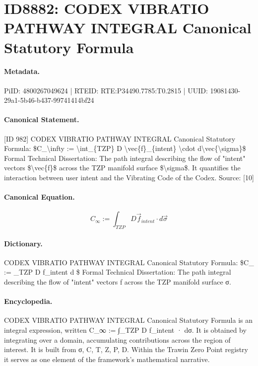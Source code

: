 \section*{ID8882: CODEX VIBRATIO PATHWAY INTEGRAL Canonical Statutory Formula}
\paragraph{Metadata.}
PiID: 4800267049624 | RTEID: RTE:P34490.7785:T0.2815 | UUID: 19081430-29a1-5b46-b437-99741414bf24

\paragraph{Canonical Statement.}
[ID 982] CODEX VIBRATIO PATHWAY INTEGRAL Canonical Statutory Formula: \$C\_\textbackslash{}infty := \textbackslash{}int\_\{TZP\} D \textbackslash{}vec\{f\}\_\{intent\} \textbackslash{}cdot d\textbackslash{}vec\{\textbackslash{}sigma\}\$ Formal Technical Dissertation: The path integral describing the flow of "intent" vectors \$\textbackslash{}vec\{f\}\$ across the TZP manifold surface \$\textbackslash{}sigma\$. It quantifies the interaction between user intent and the Vibrating Code of the Codex. Source: [10]

\paragraph{Canonical Equation.}
\[
C_\infty := \int_{TZP} D \vec{f}_{intent} \cdot d\vec{\sigma}
\]

\paragraph{Dictionary.}
CODEX VIBRATIO PATHWAY INTEGRAL Canonical Statutory Formula: \$C\_ := \_TZP D f\_intent d \$ Formal Technical Dissertation: The path integral describing the flow of "intent" vectors f across the TZP manifold surface σ.

\paragraph{Encyclopedia.}
CODEX VIBRATIO PATHWAY INTEGRAL Canonical Statutory Formula is an integral expression, written C\_∞ := ∫\_TZP D f\_intent · dσ. It is obtained by integrating over a domain, accumulating contributions across the region of interest. It is built from σ, C, T, Z, P, D. Within the Trawin Zero Point registry it serves as one element of the framework's mathematical narrative.
